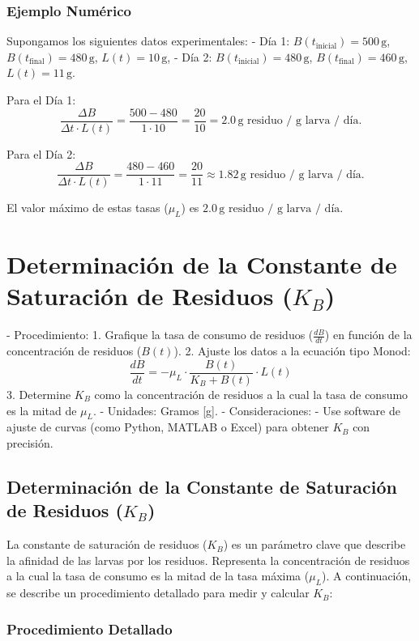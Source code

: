 \documentclass[12pt]{article}
\begin{document}
\subsubsection{Ejemplo Numérico}

Supongamos los siguientes datos experimentales:
- Día 1: $B(t_{\text{inicial}}) = 500 \, \text{g}$, $B(t_{\text{final}}) = 480 \, \text{g}$, $L(t) = 10 \, \text{g}$,
- Día 2: $B(t_{\text{inicial}}) = 480 \, \text{g}$, $B(t_{\text{final}}) = 460 \, \text{g}$, $L(t) = 11 \, \text{g}$.

Para el Día 1:
\[
\frac{\Delta B}{\Delta t \cdot L(t)} = \frac{500 - 480}{1 \cdot 10} = \frac{20}{10} = 2.0 \, \text{g residuo / g larva / día}.
\]

Para el Día 2:
\[
\frac{\Delta B}{\Delta t \cdot L(t)} = \frac{480 - 460}{1 \cdot 11} = \frac{20}{11} \approx 1.82 \, \text{g residuo / g larva / día}.
\]

El valor máximo de estas tasas ($\mu_L$) es $2.0 \, \text{g residuo / g larva / día}$.

\section{Determinación de la Constante de Saturación de Residuos ($K_B$)}
- Procedimiento:
  1. Grafique la tasa de consumo de residuos ($\frac{dB}{dt}$) en función de la concentración de residuos ($B(t)$).
  2. Ajuste los datos a la ecuación tipo Monod:
     \[
     \frac{dB}{dt} = -\mu_L \cdot \frac{B(t)}{K_B + B(t)} \cdot L(t)
     \]
  3. Determine $K_B$ como la concentración de residuos a la cual la tasa de consumo es la mitad de $\mu_L$.
- Unidades: Gramos [g].
- Consideraciones:
  - Use software de ajuste de curvas (como Python, MATLAB o Excel) para obtener $K_B$ con precisión.
\subsection{Determinación de la Constante de Saturación de Residuos ($K_B$)}

La constante de saturación de residuos ($K_B$) es un parámetro clave que describe la afinidad de las larvas por los residuos. Representa la concentración de residuos a la cual la tasa de consumo es la mitad de la tasa máxima ($\mu_L$). A continuación, se describe un procedimiento detallado para medir y calcular $K_B$:

\subsubsection{Procedimiento Detallado}
\end{document}
